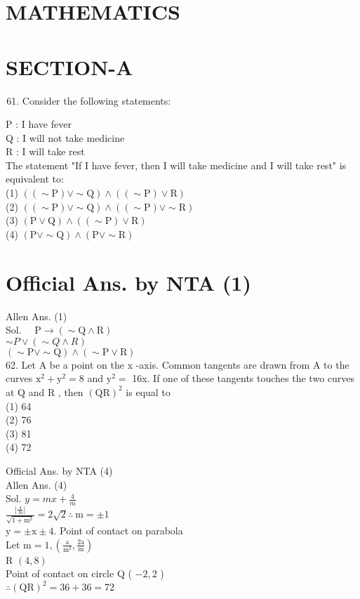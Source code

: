 \documentclass[10pt]{article}
\begin{document}
\section*{MATHEMATICS}
\section*{SECTION-A}
\begin{enumerate}
  \setcounter{enumi}{60}
  \item Consider the following statements:
\end{enumerate}

P : I have fever\\
Q : I will not take medicine\\
R : I will take rest\\
The statement "If I have fever, then I will take medicine and I will take rest" is equivalent to:\\
(1) \(((\sim \mathrm{P}) \vee \sim \mathrm{Q}) \wedge((\sim \mathrm{P}) \vee \mathrm{R})\)\\
(2) \(((\sim \mathrm{P}) \vee \sim \mathrm{Q}) \wedge((\sim \mathrm{P}) \vee \sim \mathrm{R})\)\\
(3) \((\mathrm{P} \vee \mathrm{Q}) \wedge((\sim \mathrm{P}) \vee \mathrm{R})\)\\
(4) \((\mathrm{P} \vee \sim \mathrm{Q}) \wedge(\mathrm{P} \vee \sim \mathrm{R})\)

\section*{Official Ans. by NTA (1)}
Allen Ans. (1)\\
Sol. \(\quad \mathrm{P} \rightarrow(\sim \mathrm{Q} \wedge \mathrm{R})\)\\
\(\sim P \vee(\sim Q \wedge R)\)\\
\((\sim \mathrm{P} \vee \sim \mathrm{Q}) \wedge(\sim \mathrm{P} \vee \mathrm{R})\)\\
62. Let A be a point on the x -axis. Common tangents are drawn from A to the curves \(\mathrm{x}^{2}+\mathrm{y}^{2}=8\) and \(\mathrm{y}^{2}=\) 16x. If one of these tangents touches the two curves at Q and R , then \((\mathrm{QR})^{2}\) is equal to\\
(1) 64\\
(2) 76\\
(3) 81\\
(4) 72

Official Ans. by NTA (4)\\
Allen Ans. (4)\\
Sol. \(y=m x+\frac{4}{m}\)\\
\(\frac{\left|\frac{4}{\mathrm{~m}}\right|}{\sqrt{1+\mathrm{m}^{2}}}=2 \sqrt{2} \therefore \mathrm{~m}= \pm 1\)\\
\(\mathrm{y}= \pm \mathrm{x} \pm 4\). Point of contact on parabola\\
Let \(\mathrm{m}=1,\left(\frac{\mathrm{a}}{\mathrm{m}^{2}}, \frac{2 \mathrm{a}}{\mathrm{m}}\right)\)\\
R \((4,8)\)\\
Point of contact on circle Q ( \(-2,2\) )\\
\(\therefore(\mathrm{QR})^{2}=36+36=72\)
\end{document}
